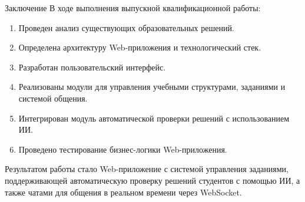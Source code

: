 \documentclass[aspectratio=169]{beamer}
\begin{document}
\begin{frame}{Заключение}
\small
В ходе выполнения выпускной квалификационной работы:

\begin{enumerate}
	\item Проведен анализ существующих образовательных решений.
	\item Определена архитектуру Web-приложения и технологический стек.
	\item Разработан пользовательский интерфейс.
	\item Реализованы модули для управления учебными структурами, заданиями и системой общения.
	\item Интегрирован модуль автоматической проверки решений с использованием ИИ.
	\item Проведено тестирование бизнес-логики Web-приложения.
\end{enumerate}

Результатом работы стало Web-приложение с системой управления заданиями, поддерживающей автоматическую проверку решений студентов с помощью ИИ, а также чатами для общения в реальном времени через WebSocket.
\end{frame}
\end{document}
